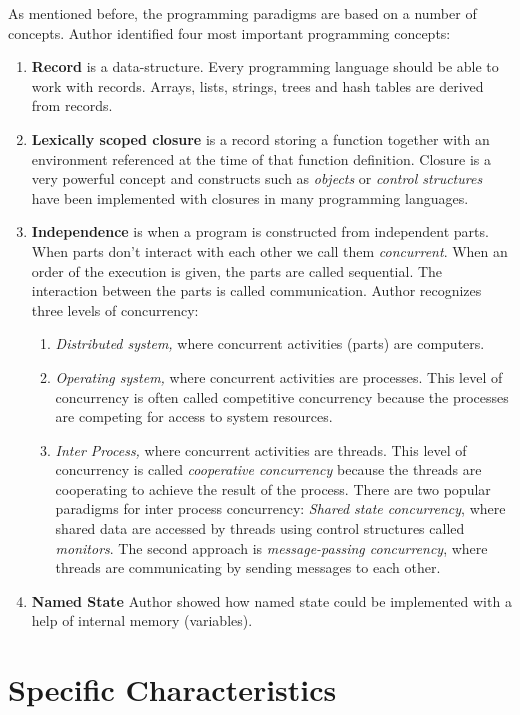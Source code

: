 \documentclass[12pt,twoside,a4paper]{report}
\begin{document}
As mentioned before, the programming paradigms are based on a number of concepts. Author identified four most important programming concepts:
\begin{enumerate}\itemsep1pt \parskip0pt 
\item \textbf{Record} is a data-structure. Every programming language should be able to work with records. Arrays, lists, strings, trees and hash tables are derived from records.
\item \textbf{Lexically scoped closure} is a record storing a function together with an environment referenced at the time of that function definition. Closure is a very powerful concept and constructs such as \textit{objects} or \textit{control structures} have been implemented with closures in many programming languages.
\item \textbf{Independence} is when a program is constructed from independent parts. When parts don’t interact with each other we call them \textit{concurrent}. When an order of the execution is given, the parts are called sequential. The interaction between the parts is called communication. Author recognizes three levels of concurrency:
    \begin{enumerate}\itemsep1pt \parskip0pt 
    \item \textit{Distributed system,} where concurrent activities (parts) are computers.
    \item \textit{Operating system,} where concurrent activities are processes. This level of concurrency is often called competitive concurrency because the processes are competing for access to system resources.
    \item \textit{Inter Process,} where concurrent activities are threads. This level of concurrency is called \textit{cooperative concurrency} because the threads are cooperating to achieve the result of the process. There are two popular paradigms for inter process concurrency: \textit{Shared state concurrency}, where shared data are accessed by threads using control structures called \textit{monitors}. The second approach is \textit{message-passing concurrency}, where threads are communicating by sending messages to each other.
    \end{enumerate}
\item \textbf{Named State} Author showed how named state could be implemented with a help of internal memory (variables).
\end{enumerate}
\section{Specific Characteristics}\label{2.3}
\end{document}
